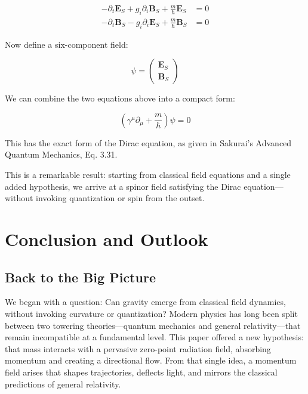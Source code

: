 \documentclass {article}
\renewcommand\vec{\mathbf}
\begin{document}
\begin{equation}
\begin{aligned}
-\partial_t \vec{E}_S + g_i \partial_i \vec{B}_S + \frac{m}{\hbar} \vec{E}_S &= 0 \\
-\partial_t \vec{B}_S - g_i \partial_i \vec{E}_S + \frac{m}{\hbar} \vec{B}_S &= 0
\end{aligned}
\end{equation}


Now define a six-component field:

\begin{equation}
\psi = \begin{pmatrix}
\vec{E}_S \\
\vec{B}_S
\end{pmatrix}
\end{equation}

We can combine the two equations above into a compact form:

\begin{equation}
\left( \gamma^\mu \partial_\mu + \frac{m}{\hbar} \right) \psi = 0
\end{equation}

This has the exact form of the Dirac equation, as given in Sakurai’s Advanced Quantum Mechanics, Eq. 3.31.

This is a remarkable result: starting from classical field equations and a single added hypothesis, we arrive at a spinor field satisfying the Dirac equation—without invoking quantization or spin from the outset. 

\section{Conclusion and Outlook}

\subsection{Back to the Big Picture}

We began with a question: Can gravity emerge from classical field dynamics, without invoking curvature or quantization? Modern physics has long been split between two towering theories—quantum mechanics and general relativity—that remain incompatible at a fundamental level. This paper offered a new hypothesis: that mass interacts with a pervasive zero-point radiation field, absorbing momentum and creating a directional flow. From that single idea, a momentum field arises that shapes trajectories, deflects light, and mirrors the classical predictions of general relativity.
\end{document}
